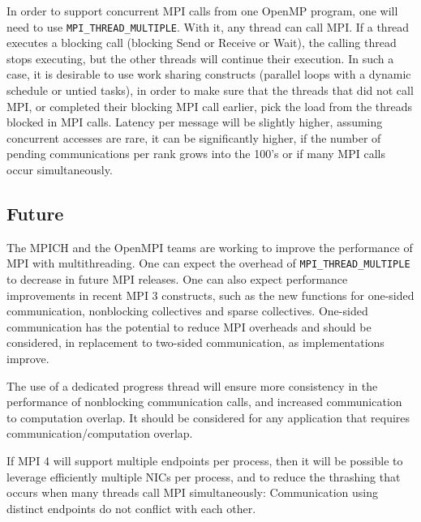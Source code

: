 	In order to support concurrent MPI calls from one OpenMP program, one will 
	need to use \texttt{MPI\_THREAD\_MULTIPLE}. With it, any thread can call 
	MPI. If a thread executes a blocking call (blocking Send or Receive or 
	Wait), the calling thread stops executing, but the other threads will 
	continue their execution. In such a case, it is desirable to use work 
	sharing constructs (parallel loops with a dynamic schedule or untied 
	tasks), 
	in order to make sure that the threads that did not call MPI, or completed 
	their blocking MPI call earlier, pick the load from the threads blocked in 
	MPI calls. Latency per message will be slightly higher, 
	assuming 
	concurrent accesses are rare, it can be significantly higher, if the number 
	of pending communications per rank grows into the 100's or if many MPI 
	calls occur simultaneously.
	
\subsection{Future}
The MPICH and the OpenMPI teams are working to improve the performance of MPI 
with multithreading. One can expect the overhead of 
\texttt{MPI\_THREAD\_MULTIPLE} to decrease in future MPI releases. One can also 
expect performance improvements in recent MPI 3 constructs, such as the new 
functions for one-sided communication, nonblocking collectives and sparse 
collectives. One-sided communication has the potential to reduce MPI overheads 
and should be considered, in replacement to two-sided communication, as 
implementations improve. 

The use of a dedicated progress thread will ensure more consistency in the 
performance of nonblocking communication calls, and increased communication to 
computation overlap. It should be considered for any application that  requires 
communication/computation overlap.


If MPI 4 will support multiple endpoints per process, then it will be possible 
to leverage efficiently multiple NICs per process, and to reduce the thrashing 
that occurs when many threads call MPI simultaneously: Communication using 
distinct endpoints do not conflict with each other.

